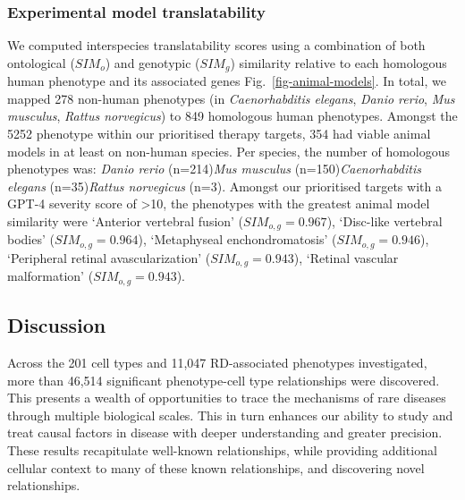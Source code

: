 \documentclass[
]{article}
\begin{document}
\subsubsection{Experimental model
translatability}\label{experimental-model-translatability}

We computed interspecies translatability scores using a combination of
both ontological (\(SIM_{o}\)) and genotypic (\(SIM_{g}\)) similarity
relative to each homologous human phenotype and its associated genes
Fig.~\ref{fig-animal-models}. In total, we mapped 278 non-human
phenotypes (in \emph{Caenorhabditis elegans}, \emph{Danio rerio},
\emph{Mus musculus}, \emph{Rattus norvegicus}) to 849 homologous human
phenotypes. Amongst the 5252 phenotype within our prioritised therapy
targets, 354 had viable animal models in at least on non-human species.
Per species, the number of homologous phenotypes was: \emph{Danio rerio}
(n=214)\emph{Mus musculus} (n=150)\emph{Caenorhabditis elegans}
(n=35)\emph{Rattus norvegicus} (n=3). Amongst our prioritised targets
with a GPT-4 severity score of \textgreater10, the phenotypes with the
greatest animal model similarity were `Anterior vertebral fusion'
(\(SIM_{o,g}=0.967\)), `Disc-like vertebral bodies'
(\(SIM_{o,g}=0.964\)), `Metaphyseal enchondromatosis'
(\(SIM_{o,g}=0.946\)), `Peripheral retinal avascularization'
(\(SIM_{o,g}=0.943\)), `Retinal vascular malformation'
(\(SIM_{o,g}=0.943\)).

\subsection{Discussion}\label{sec-discussion}

Across the 201 cell types and 11,047 RD-associated phenotypes
investigated, more than 46,514 significant phenotype-cell type
relationships were discovered. This presents a wealth of opportunities
to trace the mechanisms of rare diseases through multiple biological
scales. This in turn enhances our ability to study and treat causal
factors in disease with deeper understanding and greater precision.
These results recapitulate well-known relationships, while providing
additional cellular context to many of these known relationships, and
discovering novel relationships.
\end{document}
